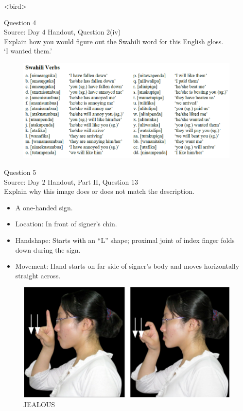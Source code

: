 \documentclass[12pt]{article}
\begin{document}
<bird>


\newpage

{\large Question 4}\\

Source: Day 4 Handout, Question 2(iv)\\

Explain how you would figure out the Swahili word for this English gloss.\\

‘I wanted them.’

\begin{figure}[H]
\includegraphics{../images/swahiliverbs.png}
\end{figure}

\newpage

{\large Question 5}\\

Source: Day 2 Handout, Part II, Question 13\\

Explain why this image does or does not match the description.\\

\begin{itemize} \item A one-handed sign. \item Location: In front of signer’s chin. \item Handshape: Starts with an “L” shape; proximal joint of index finger folds down during the sign. \item Movement: Hand starts on far side of signer’s body and moves horizontally straight across. \end{itemize}

\begin{figure}[H]
\includegraphics{../images/taiwansign_jealous.png}
\caption{JEALOUS}
\end{figure}
\end{document}
